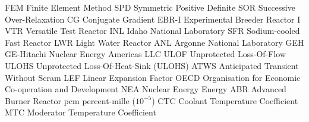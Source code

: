 \makeglossaries

   {FEM}   {Finite Element Method}
   {SPD}   {Symmetric Positive Definite}
   {SOR}   {Successive Over-Relaxation}
    {CG}    {Conjugate Gradient}
 {EBR-I} {Experimental Breeder Reactor I}
   {VTR}   {Versatile Test Reactor}
   {INL}   {Idaho National Laboratory}
   {SFR}   {Sodium-cooled Fast Reactor}
   {LWR}   {Light Water Reactor}
   {ANL}   {Argonne National Laboratory}
   {GEH}   {GE-Hitachi Nuclear Energy Americas LLC}
  {ULOF}  {Unprotected Loss-Of-Flow}
 {ULOHS} {Unprotected Loss-Of-Heat-Sink (ULOHS)}
  {ATWS}  {Anticipated Transient Without Scram}
   {LEF}   {Linear Expansion Factor}
  {OECD}  {Organisation for Economic Co-operation and Development}
   {NEA}   {Nuclear Energy Energy}
   {ABR}   {Advanced Burner Reactor}
   {pcm}   {percent-mille ($10^{-5}$)}
   {CTC}   {Coolant Temperature Coefficient}
   {MTC}   {Moderator Temperature Coefficient}
